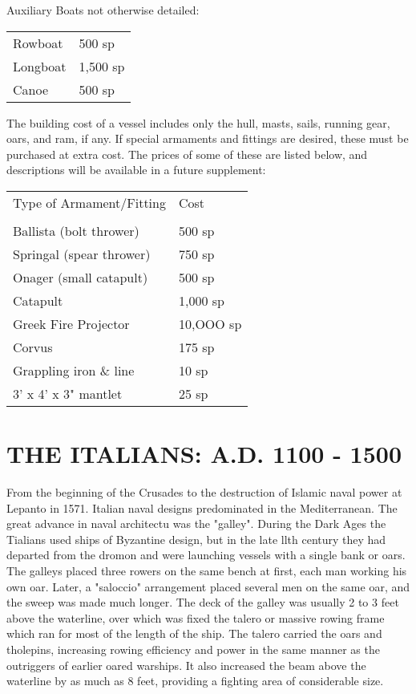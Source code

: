 \documentclass{article}
\begin{document}
\begin{multicols}{2}
Auxiliary Boats not otherwise detailed:

\begin{tabular}{ll}
Rowboat   & 500 sp \\
Longboat  & 1,500  sp \\
Canoe     & 500 sp \\
\end{tabular}

The building cost of a vessel includes only the hull, masts, sails, running
gear, oars, and ram, if any.  If special armaments and fittings are desired,
these must be purchased at extra cost.  The prices of some of these are listed
below, and descriptions will be available in a future supplement:

\begin{tabular}{ll}
Type of Armament/Fitting  	& Cost \\
\\
Ballista (bolt thrower)    	& 500  sp \\
Springal (spear thrower)   	& 750  sp \\
Onager (small catapult)    	& 500  sp \\
Catapult                   	& 1,000 sp \\
Greek Fire Projector       	& 10,OOO sp \\
Corvus                     	& 175  sp \\
Grappling iron \&  line     	& 10  sp \\
3' x 4' x 3" mantlet       	& 25  sp \\
\end{tabular}

\section{THE ITALIANS:  A.D. 1100 - 1500}

From the beginning of the Crusades to the destruction of Islamic naval
power at Lepanto in 1571.  Italian naval designs predominated in the
Mediterranean.  The great advance in naval architectu was the
"galley".  During the Dark Ages the Tialians used ships of Byzantine
design, but in the late llth century they had departed from the dromon
and were launching vessels with a single bank or oars.  The galleys
placed three rowers on the same bench at first, each man working his
own oar.  Later, a "saloccio" arrangement placed several men on the
same oar, and the sweep was made much longer.  The deck of the galley
was usually 2 to 3 feet above the waterline, over which was fixed the
talero or massive rowing frame which ran for most of the length of the
ship.  The talero carried the oars and tholepins, increasing rowing
efficiency and power in the same manner as the outriggers of earlier
oared warships.  It also increased the beam above the waterline by as
much as 8 feet, providing a fighting area of considerable size.


\end{multicols}
\end{document}
